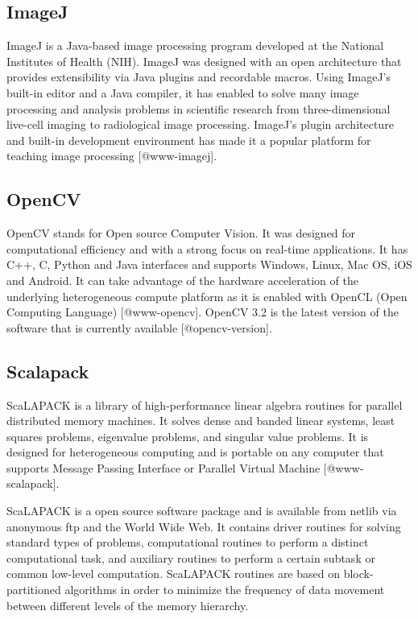 \subsection{ImageJ}

ImageJ is a Java-based image processing program developed at the
National Institutes of Health (NIH). ImageJ was designed with an open
architecture that provides extensibility via Java plugins and
recordable macros.  Using ImageJ's built-in editor and a Java
compiler, it has enabled to solve many image processing and analysis
problems in scientific research from three-dimensional live-cell
imaging to radiological image processing.  ImageJ's plugin
architecture and built-in development environment has made it a
popular platform for teaching image processing [@www-imagej].

\subsection{OpenCV}

OpenCV stands for Open source Computer Vision. It was designed for
computational efficiency and with a strong focus on real-time
applications. It has C++, C, Python and Java interfaces and supports
Windows, Linux, Mac OS, iOS and Android. It can take advantage of the
hardware acceleration of the underlying heterogeneous compute platform
as it is enabled with OpenCL (Open Computing
Language) [@www-opencv]. OpenCV 3.2 is the latest version of the
software that is currently available [@opencv-version].

\subsection{Scalapack}

ScaLAPACK is a library of high-performance linear algebra routines for
parallel distributed memory machines. It solves dense and banded
linear systems, least squares problems, eigenvalue problems, and
singular value problems. It is designed for heterogeneous computing
and is portable on any computer that supports Message Passing
Interface or Parallel Virtual Machine [@www-scalapack].

ScaLAPACK is a open source software package and is available from
netlib via anonymous ftp and the World Wide Web. It contains driver
routines for solving standard types of problems, computational
routines to perform a distinct computational task, and auxiliary
routines to perform a certain subtask or common low-level
computation. ScaLAPACK routines are based on block-partitioned
algorithms in order to minimize the frequency of data movement between
different levels of the memory hierarchy.
    
